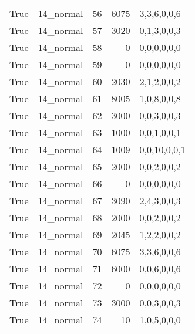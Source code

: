 \begin{tabular}{llrrl}
 True            & 14\_normal           &            56 &                  6075 & 3,3,6,0,0,6   \\
 True            & 14\_normal           &            57 &                  3020 & 0,1,3,0,0,3   \\
 True            & 14\_normal           &            58 &                     0 & 0,0,0,0,0,0   \\
 True            & 14\_normal           &            59 &                     0 & 0,0,0,0,0,0   \\
 True            & 14\_normal           &            60 &                  2030 & 2,1,2,0,0,2   \\
 True            & 14\_normal           &            61 &                  8005 & 1,0,8,0,0,8   \\
 True            & 14\_normal           &            62 &                  3000 & 0,0,3,0,0,3   \\
 True            & 14\_normal           &            63 &                  1000 & 0,0,1,0,0,1   \\
 True            & 14\_normal           &            64 &                  1009 & 0,0,10,0,0,1  \\
 True            & 14\_normal           &            65 &                  2000 & 0,0,2,0,0,2   \\
 True            & 14\_normal           &            66 &                     0 & 0,0,0,0,0,0   \\
 True            & 14\_normal           &            67 &                  3090 & 2,4,3,0,0,3   \\
 True            & 14\_normal           &            68 &                  2000 & 0,0,2,0,0,2   \\
 True            & 14\_normal           &            69 &                  2045 & 1,2,2,0,0,2   \\
 True            & 14\_normal           &            70 &                  6075 & 3,3,6,0,0,6   \\
 True            & 14\_normal           &            71 &                  6000 & 0,0,6,0,0,6   \\
 True            & 14\_normal           &            72 &                     0 & 0,0,0,0,0,0   \\
 True            & 14\_normal           &            73 &                  3000 & 0,0,3,0,0,3   \\
 True            & 14\_normal           &            74 &                    10 & 1,0,5,0,0,0   \\

\end{tabular}

